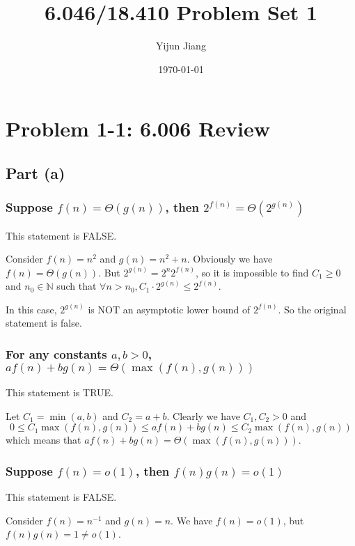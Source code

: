\documentclass{article}
\title{6.046/18.410 Problem Set 1}
\author{Yijun Jiang}
\date{\today}
\begin{document}
\maketitle
\section{Problem 1-1: 6.006 Review}
\subsection{Part (a)}
\subsubsection{Suppose $f(n)=\Theta(g(n))$, then $2^{f(n)}=\Theta(2^{g(n)})$}
This statement is FALSE.

Consider $f(n)=n^2$ and $g(n)=n^2+n$. Obviously we have $f(n)=\Theta(g(n))$. But $2^{g(n)}=2^n2^{f(n)}$, so it is impossible to find $C_1\geqslant0$ and $n_0\in\mathbb{N}$ such that $\forall n>n_0, C_1\cdot2^{g(n)}\leqslant 2^{f(n)}$.

In this case, $2^{g(n)}$ is NOT an asymptotic lower bound of $2^{f(n)}$. So the original statement is false.

\subsubsection{For any constants $a,b>0$, $af(n)+bg(n)=\Theta(\max{(f(n),g(n))})$}
This statement is TRUE.

Let $C_1=\min{(a,b)}$ and $C_2=a+b$. Clearly we have $C_1,C_2>0$ and
\begin{equation*}
0\leqslant C_1\max{(f(n),g(n))}\leqslant af(n)+bg(n)\leqslant C_2\max{(f(n),g(n))}
\end{equation*}
which means that $af(n)+bg(n)=\Theta(\max{(f(n),g(n))})$.

\subsubsection{Suppose $f(n)=o(1)$, then $f(n)g(n)=o(1)$}
This statement is FALSE.

Consider $f(n)=n^{-1}$ and $g(n)=n$. We have $f(n)=o(1)$, but $f(n)g(n)=1\neq o(1)$.
\end{document}
